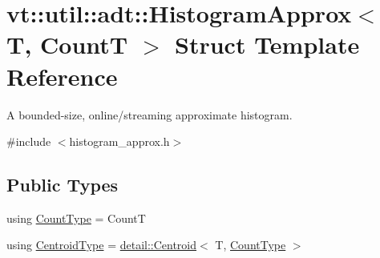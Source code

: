 \hypertarget{structvt_1_1util_1_1adt_1_1_histogram_approx}{}\section{vt\+:\+:util\+:\+:adt\+:\+:Histogram\+Approx$<$ T, CountT $>$ Struct Template Reference}
\label{structvt_1_1util_1_1adt_1_1_histogram_approx}


A bounded-\/size, online/streaming approximate histogram.  




{\ttfamily \#include $<$histogram\+\_\+approx.\+h$>$}

\subsection*{Public Types}
\begin{DoxyCompactItemize}
\item 
using \hyperlink{structvt_1_1util_1_1adt_1_1_histogram_approx_aa2fb74665588d311da76dd821f2912c6}{Count\+Type} = CountT
\item 
using \hyperlink{structvt_1_1util_1_1adt_1_1_histogram_approx_aabacbad5be3a407cb00938f079177b95}{Centroid\+Type} = \hyperlink{structvt_1_1util_1_1adt_1_1detail_1_1_centroid}{detail\+::\+Centroid}$<$ T, \hyperlink{structvt_1_1util_1_1adt_1_1_histogram_approx_aa2fb74665588d311da76dd821f2912c6}{Count\+Type} $>$
\end{DoxyCompactItemize}

